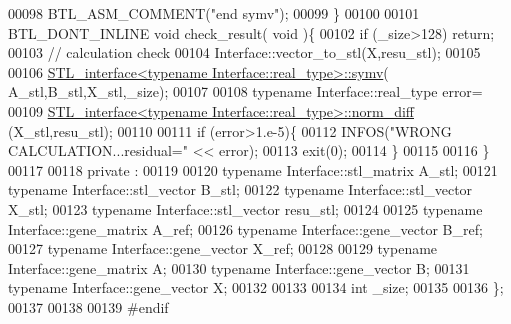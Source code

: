 \begin{DoxyCode}
00098       BTL\_ASM\_COMMENT(\textcolor{stringliteral}{"end symv"});
00099   \}
00100 
00101   BTL\_DONT\_INLINE \textcolor{keywordtype}{void} check\_result( \textcolor{keywordtype}{void} )\{
00102     \textcolor{keywordflow}{if} (\_size>128) \textcolor{keywordflow}{return};
00103     \textcolor{comment}{// calculation check}
00104     Interface::vector\_to\_stl(X,resu\_stl);
00105 
00106     \hyperlink{class_s_t_l__interface}{STL\_interface<typename Interface::real\_type>::symv}(
      A\_stl,B\_stl,X\_stl,\_size);
00107 
00108     \textcolor{keyword}{typename} Interface::real\_type error=
00109       \hyperlink{class_s_t_l__interface}{STL\_interface<typename Interface::real\_type>::norm\_diff}
      (X\_stl,resu\_stl);
00110 
00111     \textcolor{keywordflow}{if} (error>1.e-5)\{
00112       INFOS(\textcolor{stringliteral}{"WRONG CALCULATION...residual="} << error);
00113       exit(0);
00114     \}
00115 
00116   \}
00117 
00118 private :
00119 
00120   \textcolor{keyword}{typename} Interface::stl\_matrix A\_stl;
00121   \textcolor{keyword}{typename} Interface::stl\_vector B\_stl;
00122   \textcolor{keyword}{typename} Interface::stl\_vector X\_stl;
00123   \textcolor{keyword}{typename} Interface::stl\_vector resu\_stl;
00124 
00125   \textcolor{keyword}{typename} Interface::gene\_matrix A\_ref;
00126   \textcolor{keyword}{typename} Interface::gene\_vector B\_ref;
00127   \textcolor{keyword}{typename} Interface::gene\_vector X\_ref;
00128 
00129   \textcolor{keyword}{typename} Interface::gene\_matrix A;
00130   \textcolor{keyword}{typename} Interface::gene\_vector B;
00131   \textcolor{keyword}{typename} Interface::gene\_vector X;
00132 
00133 
00134   \textcolor{keywordtype}{int} \_size;
00135 
00136 \};
00137 
00138 
00139 \textcolor{preprocessor}{#endif}
\end{DoxyCode}
